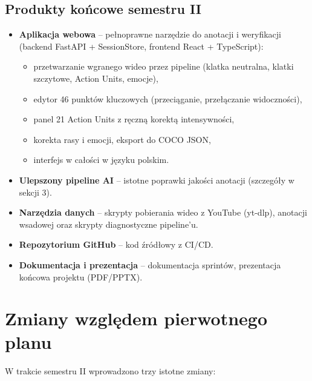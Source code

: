 \documentclass[11pt,a4paper]{article}
\begin{document}
\subsection{Produkty końcowe semestru II}
\begin{itemize}
  \item \textbf{Aplikacja webowa} -- pełnoprawne narzędzie do anotacji i weryfikacji
        (backend FastAPI + SessionStore, frontend React + TypeScript):
  \begin{itemize}
    \item przetwarzanie wgranego wideo przez pipeline (klatka neutralna, klatki
          szczytowe, Action Units, emocje),
    \item edytor 46 punktów kluczowych (przeciąganie, przełączanie widoczności),
    \item panel 21 Action Units z ręczną korektą intensywności,
    \item korekta rasy i emocji, eksport do COCO JSON,
    \item interfejs w całości w języku polskim.
  \end{itemize}
  \item \textbf{Ulepszony pipeline AI} -- istotne poprawki jakości anotacji
        (szczegóły w sekcji 3).
  \item \textbf{Narzędzia danych} -- skrypty pobierania wideo z YouTube (yt-dlp),
        anotacji wsadowej oraz skrypty diagnostyczne pipeline'u.
  \item \textbf{Repozytorium GitHub} -- kod źródłowy z CI/CD.
  \item \textbf{Dokumentacja i prezentacja} -- dokumentacja sprintów, prezentacja
        końcowa projektu (PDF/PPTX).
\end{itemize}

\section{Zmiany względem pierwotnego planu}

W trakcie semestru II wprowadzono trzy istotne zmiany:
\end{document}
